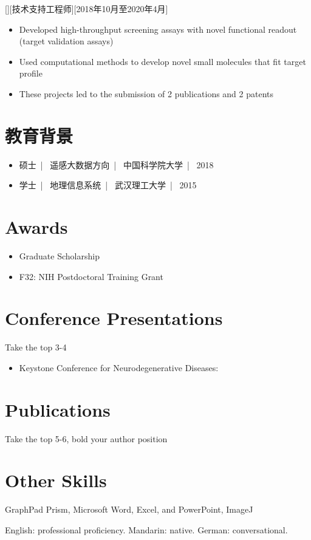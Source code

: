 \documentclass{article}
\begin{document}
[][技术支持工程师][2018年10月至2020年4月]

\begin{itemize}
\item Developed high-throughput screening assays with novel functional readout (target validation assays)
\item Used computational methods to develop novel small molecules that fit target profile
\item These projects led to the submission of 2 publications and 2 patents
\end{itemize}

 
\section{教育背景}

\begin{itemize}
\item 硕士\ | \ 遥感大数据方向\ | \ 中国科学院大学\ | \ 2018
\item 学士\ | \ 地理信息系统\ | \ 武汉理工大学\ | \ 2015
\end{itemize}

\section{Awards}
\begin{itemize}
\item Graduate Scholarship 
\item F32: NIH Postdoctoral Training Grant
\end{itemize}

\section{Conference Presentations }

Take the top 3-4
\begin{itemize}
\item Keystone Conference for Neurodegenerative Diseases:
\end{itemize}

 
\section{Publications}
Take the top 5-6, bold your author position 


\section{Other Skills}
\begin{description}[widest=Langauges]
\item[Software]	GraphPad Prism, Microsoft Word, Excel, and PowerPoint, ImageJ
\item[Languages]	English: professional proficiency.  Mandarin: native.  German: conversational.
\end{description}
\end{document}
